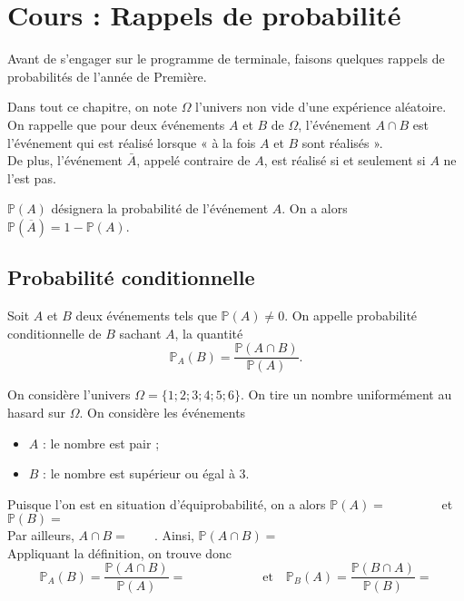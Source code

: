 \documentclass[11pt,fleqn, openany]{book} %
\begin{document}

\chapter{Cours : Rappels de probabilité}



Avant de s'engager sur le programme de terminale, faisons quelques rappels de probabilités de l'année de Première.

Dans tout ce chapitre, on note $\Omega$ l'univers non vide d'une expérience aléatoire.\\
On rappelle que pour deux événements $A$ et $B$ de $\Omega$, l'événement $A \cap B$ est l'événement qui est réalisé lorsque « à la fois $A$ et $B$ sont réalisés ».\\De plus, l'événement $\bar{A}$, appelé contraire de $A$, est réalisé si et seulement si $A$ ne l'est pas.

$\mathbb{P}(A)$ désignera la probabilité de l'événement $A$. On a alors $\mathbb{P}(\overline{A})=1-\mathbb{P}(A)$.


\section{Probabilité conditionnelle}

\begin{definition}Soit $A$ et $B$ deux événements tels que $\mathbb{P}(A)\neq 0$. On appelle probabilité conditionnelle de $B$ sachant $A$, la quantité
\[ \mathbb{P}_A(B)=\dfrac{\mathbb{P}(A\cap B)}{\mathbb{P}(A)}.\]\end{definition}

\begin{example} On considère l'univers $\Omega = \{ 1;2;3;4;5;6\}$. On tire un nombre uniformément au hasard sur $\Omega$. On  considère les événements
\begin{itemize}
\item $A$ : le nombre est pair ;
\item $B$ : le nombre est supérieur ou égal à 3.
\end{itemize}
Puisque l'on est en situation d'équiprobabilité, on a alors $\mathbb{P}(A)=\qquad\qquad$ et $\mathbb{P}(B)=$\\
Par ailleurs, $A\cap B = \qquad $. Ainsi, $\mathbb{P}(A \cap B) = $\\
Appliquant la définition, on trouve donc 
\[ \mathbb{P}_A(B)=\dfrac{\mathbb{P}(A\cap B)}{\mathbb{P}(A)}=\qquad\qquad\qquad
\text{et} 
\quad \mathbb{P}_B(A)=\dfrac{\mathbb{P}(B\cap A)}{\mathbb{P}(B)}=\]
\end{example}
\end{document}
